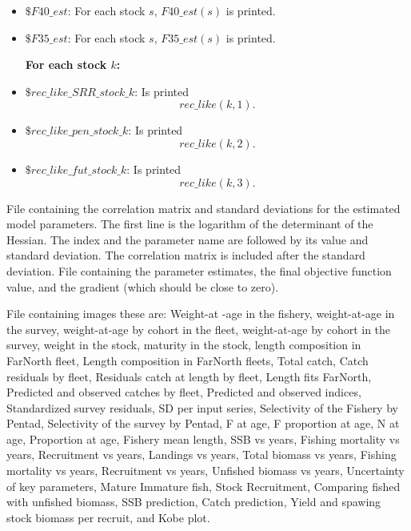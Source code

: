 \documentclass{article}
\newcounter{subsubsubsection}[subsubsection]
\begin{document}
\begin{itemize}
\item $\$ F40\_est$: For each stock $s$, $F40\_est(s)$ is printed.

\item $\$ F35\_est$: For each stock $s$, $F35\_est(s)$ is printed.

\textbf{For each stock $k$:}

\item  $\$ rec\_like\_SRR\_stock\_k$: Is printed 
\begin{equation*}
    rec\_like(k,1).
\end{equation*}
\item $\$ rec\_like\_pen\_stock\_k$: Is printed
\begin{equation*}
    rec\_like(k,2).
\end{equation*}
\item $\$ rec\_like\_fut\_stock\_k$: Is printed
\begin{equation*}
    rec\_like(k,3).
\end{equation*}


\end{itemize}
     File containing the correlation matrix and standard deviations for the estimated model parameters. The first line is the logarithm of the determinant of the Hessian. The index and the parameter name  are followed by its value and standard deviation. The correlation matrix is included after the standard deviation.
     File containing the parameter estimates, the final objective function value, and the gradient (which should be close to zero).
    
     File containing images these are: Weight-at -age in the fishery, weight-at-age in the survey, weight-at-age by cohort in the fleet, weight-at-age by cohort in the survey, weight in the stock, maturity in the stock, length composition in FarNorth fleet, Length composition in FarNorth fleets, Total catch, Catch residuals by fleet, Residuals catch at length by fleet, Length fits FarNorth, Predicted and observed catches by fleet, Predicted and observed indices, Standardized survey residuals, SD per input series, Selectivity of the Fishery by Pentad, Selectivity of the survey by Pentad, F at age, F proportion at age, N at age, Proportion at age, Fishery mean length, SSB vs years,  Fishing mortality vs years, Recruitment vs years, Landings vs years, Total biomass vs years, Fishing mortality vs years, Recruitment vs years, Unfished biomass vs years, Uncertainty of key parameters, Mature Immature fish, Stock Recruitment, Comparing fished with unfished biomass, SSB prediction, Catch prediction, Yield and spawing stock biomass per recruit, and Kobe plot. 
\end{document}
